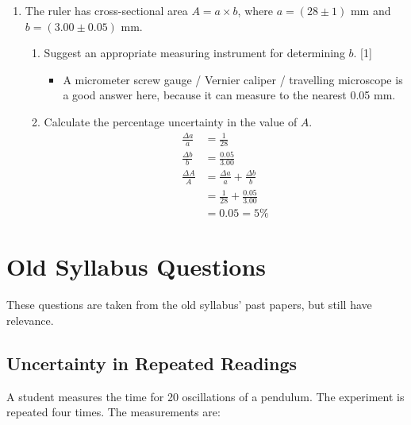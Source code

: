 \documentclass[a4paper,12pt]{article}
\let\oldsection\section
\renewcommand\section{\clearpage\oldsection}
\let\oldsubsection\subsection
\renewcommand\subsection{\clearpage\oldsubsection}
\begin{document}
\begin{enumerate}[label=(\alph*)]
\begin{itemize}
        \end{itemize}

        \pagebreak
  \item The ruler has cross-sectional area $A = a\times b$, where $a = (28 \pm 1)$ mm and $b = (3.00 \pm 0.05)$ mm.

        \begin{enumerate}
          \item Suggest an appropriate measuring instrument for determining $b$. \hfill [1]
                \begin{itemize}
                  \item A micrometer screw gauge / Vernier caliper / travelling microscope is a good answer here, because it can measure to the nearest 0.05 mm.
                \end{itemize}
          \item Calculate the percentage uncertainty in the value of $A$.
                \begin{align*}
                  \frac{\Delta a}{a} & = \frac{1}{28}                            \\
                  \frac{\Delta b}{b} & = \frac{0.05}{3.00}                       \\
                  \frac{\Delta A}{A} & = \frac{\Delta a}{a} + \frac{\Delta b}{b} \\
                                     & = \frac{1}{28} + \frac{0.05}{3.00}        \\
                                     & = 0.05 = 5\%
                \end{align*}
        \end{enumerate}

\end{enumerate}

\section{Old Syllabus Questions}

These questions are taken from the old syllabus' past papers, but still have relevance.

\subsection{Uncertainty in Repeated Readings}

A student measures the time for 20 oscillations of a pendulum. The experiment is repeated four times. The measurements are:
\end{document}
